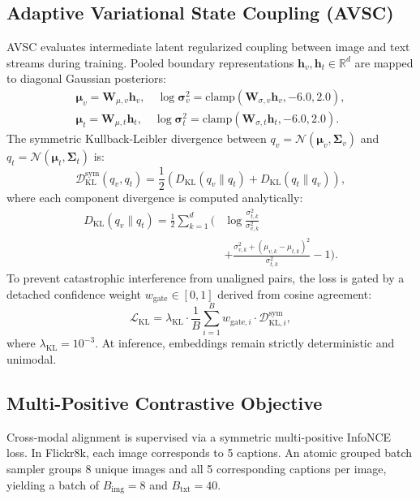 \documentclass[10pt,journal,final]{IEEEtran}
\begin{document}
\subsection{Adaptive Variational State Coupling (AVSC)}
AVSC evaluates intermediate latent regularized coupling between image and text streams during training. Pooled boundary representations $\mathbf{h}_v, \mathbf{h}_t \in \mathbb{R}^d$ are mapped to diagonal Gaussian posteriors:
\begin{align}
\label{eq:avsc_params_v}
\boldsymbol{\mu}_v = \mathbf{W}_{\mu, v} \mathbf{h}_v, \quad \log \boldsymbol{\sigma}_v^2 = \mathrm{clamp}(\mathbf{W}_{\sigma, v} \mathbf{h}_v, -6.0, 2.0), \\
\label{eq:avsc_params_t}
\boldsymbol{\mu}_t = \mathbf{W}_{\mu, t} \mathbf{h}_t, \quad \log \boldsymbol{\sigma}_t^2 = \mathrm{clamp}(\mathbf{W}_{\sigma, t} \mathbf{h}_t, -6.0, 2.0).
\end{align}
The symmetric Kullback-Leibler divergence between $q_v = \mathcal{N}(\boldsymbol{\mu}_v, \boldsymbol{\Sigma}_v)$ and $q_t = \mathcal{N}(\boldsymbol{\mu}_t, \boldsymbol{\Sigma}_t)$ is:
\begin{equation}
\label{eq:kl_sym}
\mathcal{D}_{\mathrm{KL}}^{\mathrm{sym}}(q_v, q_t) = \frac{1}{2}\left( D_{\mathrm{KL}}(q_v \parallel q_t) + D_{\mathrm{KL}}(q_t \parallel q_v) \right),
\end{equation}
where each component divergence is computed analytically:
\begin{equation}
\label{eq:kl_component}
\begin{aligned}
D_{\mathrm{KL}}(q_v \parallel q_t) = \frac{1}{2} \sum_{k=1}^d \bigg( &\log \frac{\sigma_{t,k}^2}{\sigma_{v,k}^2} \\
&+ \frac{\sigma_{v,k}^2 + (\mu_{v,k} - \mu_{t,k})^2}{\sigma_{t,k}^2} - 1 \bigg).
\end{aligned}
\end{equation}
To prevent catastrophic interference from unaligned pairs, the loss is gated by a detached confidence weight $w_{\mathrm{gate}} \in [0, 1]$ derived from cosine agreement:
\begin{equation}
\label{eq:avsc_loss}
\mathcal{L}_{\mathrm{KL}} = \lambda_{\mathrm{KL}} \cdot \frac{1}{B}\sum_{i=1}^B w_{\mathrm{gate}, i} \cdot \mathcal{D}_{\mathrm{KL}, i}^{\mathrm{sym}},
\end{equation}
where $\lambda_{\mathrm{KL}} = 10^{-3}$. At inference, embeddings remain strictly deterministic and unimodal.

\subsection{Multi-Positive Contrastive Objective}
Cross-modal alignment is supervised via a symmetric multi-positive InfoNCE loss. In Flickr8k, each image corresponds to 5 captions. An atomic grouped batch sampler groups 8 unique images and all 5 corresponding captions per image, yielding a batch of $B_{\mathrm{img}} = 8$ and $B_{\mathrm{txt}} = 40$.
\end{document}
